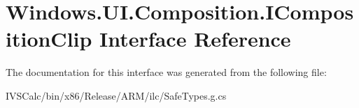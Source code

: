 \hypertarget{interface_windows_1_1_u_i_1_1_composition_1_1_i_composition_clip}{}\section{Windows.\+U\+I.\+Composition.\+I\+Composition\+Clip Interface Reference}
\label{interface_windows_1_1_u_i_1_1_composition_1_1_i_composition_clip}


The documentation for this interface was generated from the following file\+:\begin{DoxyCompactItemize}
\item 
I\+V\+S\+Calc/bin/x86/\+Release/\+A\+R\+M/ilc/Safe\+Types.\+g.\+cs\end{DoxyCompactItemize}

